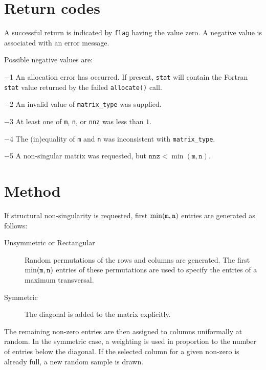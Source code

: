 
\section{Return codes} \label{errors}

A successful return is indicated by
{\tt flag} having the value zero.
A negative value is associated with an error message.

Possible negative values are:

\begin{description}
\item{$-$1} An allocation error has occurred. If present, {\tt stat} will
   contain the Fortran {\tt stat} value returned by the failed {\tt allocate()}
   call.
\item{$-$2} An invalid value of {\tt matrix\_type} was supplied.
\item{$-$3} At least one of {\tt m}, {\tt n}, or {\tt nnz} was less than $1$.
\item{$-$4} The (in)equality of {\tt m} and {\tt n} was inconsistent with
   {\tt matrix\_type}.
\item{$-$5} A non-singular matrix was requested, but $\texttt{nnz}<\min(\texttt{m},\texttt{n})$.
\end{description}

\section{Method} \label{method}

If structural non-singularity is requested, first $\min({\tt m}, {\tt n})$ entries are generated as follows:
\begin{description}
   \item[Unsymmetric or Rectangular] Random permutations of the rows and
      columns are generated. The first $\min({\tt m}, {\tt n})$ entries of
      these permutations are used to specify the entries of a maximum
      transversal.
   \item[Symmetric] The diagonal is added to the matrix explicitly.
\end{description}

The remaining non-zero entries are then assigned to columns uniformally at
random. In the symmetric case, a weighting is used in proportion to the number of
entries below the diagonal. If the selected column for a given non-zero is 
already full, a new random sample is drawn.

